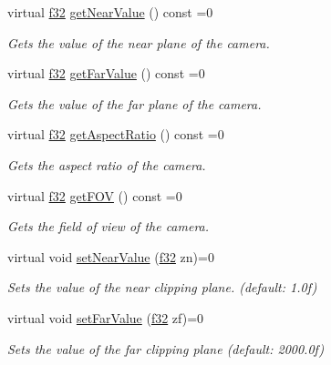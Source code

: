 \begin{DoxyCompactItemize}
virtual \hyperlink{namespaceirr_a0277be98d67dc26ff93b1a6a1d086b07}{f32} \hyperlink{classirr_1_1scene_1_1ICameraSceneNode_aee5dfccee2ec0b0cbcdb1079a6430a25}{get\+Near\+Value} () const =0
\begin{DoxyCompactList}\small\item\em Gets the value of the near plane of the camera. \end{DoxyCompactList}\item 
virtual \hyperlink{namespaceirr_a0277be98d67dc26ff93b1a6a1d086b07}{f32} \hyperlink{classirr_1_1scene_1_1ICameraSceneNode_a7a6603b808522605276359b834d48245}{get\+Far\+Value} () const =0
\begin{DoxyCompactList}\small\item\em Gets the value of the far plane of the camera. \end{DoxyCompactList}\item 
virtual \hyperlink{namespaceirr_a0277be98d67dc26ff93b1a6a1d086b07}{f32} \hyperlink{classirr_1_1scene_1_1ICameraSceneNode_aed7af13bc5a076d61a10a1998f71742e}{get\+Aspect\+Ratio} () const =0
\begin{DoxyCompactList}\small\item\em Gets the aspect ratio of the camera. \end{DoxyCompactList}\item 
virtual \hyperlink{namespaceirr_a0277be98d67dc26ff93b1a6a1d086b07}{f32} \hyperlink{classirr_1_1scene_1_1ICameraSceneNode_a8396148b1c3e27e79a615a859ae7d75d}{get\+F\+OV} () const =0
\begin{DoxyCompactList}\small\item\em Gets the field of view of the camera. \end{DoxyCompactList}\item 
virtual void \hyperlink{classirr_1_1scene_1_1ICameraSceneNode_aab5107ae5d0373d6fb005a87741e7057}{set\+Near\+Value} (\hyperlink{namespaceirr_a0277be98d67dc26ff93b1a6a1d086b07}{f32} zn)=0
\begin{DoxyCompactList}\small\item\em Sets the value of the near clipping plane. (default\+: 1.\+0f) \end{DoxyCompactList}\item 
virtual void \hyperlink{classirr_1_1scene_1_1ICameraSceneNode_ab7e427dd639b6bb63f648d6d087da1ea}{set\+Far\+Value} (\hyperlink{namespaceirr_a0277be98d67dc26ff93b1a6a1d086b07}{f32} zf)=0
\begin{DoxyCompactList}\small\item\em Sets the value of the far clipping plane (default\+: 2000.\+0f) \end{DoxyCompactList}\item 

\end{DoxyCompactItemize}
